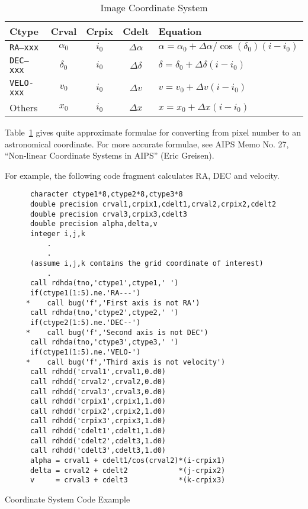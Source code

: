\documentclass{report}
\begin{document}
\begin{table}\centering
\begin{tabular}{|lcccl|}\hline
Ctype & Crval & Crpix & Cdelt & Equation		\\ \hline
{\tt RA---xxx}& $\alpha_0$ & $i_0$ & $\Delta\alpha$ &
  $\alpha=\alpha_0+\Delta\alpha/\cos(\delta_0)(i-i_0)$	\\
{\tt DEC--xxx}& $\delta_0$ & $i_0$ & $\Delta\delta$ &
  $\delta=\delta_0+\Delta\delta(i-i_0)$			\\
{\tt VELO-xxx}& $v_0$ & $i_0$ & $\Delta v$ &
  $v=v_0+\Delta v(i-i_0)$				\\
Others& $x_0$ & $i_0$ & $\Delta x$ &
  $x=x_0+\Delta x(i-i_0)$				\\ \hline
\end{tabular}
\caption{Image Coordinate System}
\label{t:coord}
\end{table}

Table~\ref{t:coord} gives quite approximate formulae for converting from
pixel number to an astronomical coordinate. For more accurate formulae, see
AIPS Memo No. 27, ``Non-linear Coordinate Systems in AIPS'' (Eric Greisen).

For example, the following code fragment calculates RA, DEC and velocity.
\begin{table}
\begin{verbatim}
      character ctype1*8,ctype2*8,ctype3*8
      double precision crval1,crpix1,cdelt1,crval2,crpix2,cdelt2
      double precision crval3,crpix3,cdelt3
      double precision alpha,delta,v
      integer i,j,k
          .
          .
      (assume i,j,k contains the grid coordinate of interest)
          .
      call rdhda(tno,'ctype1',ctype1,' ')
      if(ctype1(1:5).ne.'RA---')
     *    call bug('f','First axis is not RA')
      call rdhda(tno,'ctype2',ctype2,' ')
      if(ctype2(1:5).ne.'DEC--')
     *    call bug('f','Second axis is not DEC')
      call rdhda(tno,'ctype3',ctype3,' ')
      if(ctype1(1:5).ne.'VELO-')
     *    call bug('f','Third axis is not velocity')
      call rdhdd('crval1',crval1,0.d0)
      call rdhdd('crval2',crval2,0.d0)
      call rdhdd('crval3',crval3,0.d0)
      call rdhdd('crpix1',crpix1,1.d0)
      call rdhdd('crpix2',crpix2,1.d0)
      call rdhdd('crpix3',crpix3,1.d0)
      call rdhdd('cdelt1',cdelt1,1.d0)
      call rdhdd('cdelt2',cdelt3,1.d0)
      call rdhdd('cdelt3',cdelt3,1.d0)
      alpha = crval1 + cdelt1/cos(crval2)*(i-crpix1)
      delta = crval2 + cdelt2            *(j-crpix2)
      v     = crval3 + cdelt3            *(k-crpix3)
\end{verbatim}
\caption{Coordinate System Code Example}
\end{table}
\end{document}
